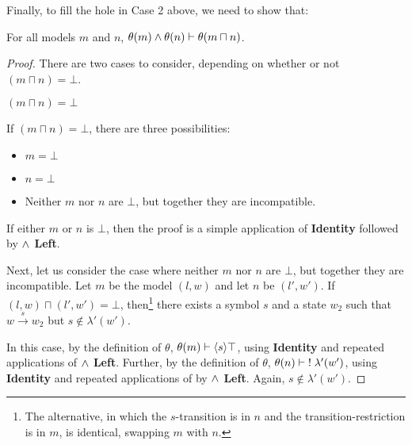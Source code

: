 Finally, to fill the hole in Case 2 above, we need to show that:
\begin{lemma}
For all models $m$ and $n$, $\theta(m) \land \theta(n) \vdash \theta (m \sqcap n)$.
\end{lemma}

\begin{proof}

There are two cases to consider, depending on whether or not $(m \sqcap n) = \bot$.

\setcounter{mycase}{0}

\begin{mycase}
$(m \sqcap n) = \bot$
\end{mycase}
If $(m \sqcap n) = \bot$, there are three possibilities:
\begin{itemize}
\item
$m = \bot$
\item
$n = \bot$
\item
Neither $m$ nor $n$ are $\bot$, but together they are incompatible. 
\end{itemize}
If either $m$ or $n$ is $\bot$, then the proof is a simple application of {\bf Identity} followed by {\bf $\land$ Left}.

Next, let us consider the case where neither $m$ nor $n$ are $\bot$, but together they are incompatible.
Let $m$ be the  model $(l, w)$ and let $n$ be $(l', w')$.
If $(l, w) \sqcap (l', w') = \bot$, then\footnote{The alternative, in which the $s$-transition is in $n$ and the transition-restriction is in $m$, is identical, swapping $m$ with $n$.} there exists a symbol $s$ and a state $w_2$ such that $w \xrightarrow{s} w_2$ but $s \notin \lambda'(w')$.

In this case, by the definition of $\theta$, $\theta(m) \vdash \langle s \rangle \top$, using  {\bf Identity} and repeated applications of {\bf $\land$ Left}.
Further, by the definition of $\theta$, $\theta(n) \vdash \; ! \; \lambda'(w')$, using  {\bf Identity} and repeated applications of by {\bf $\land$ Left}. Again, $s \notin  \lambda'(w')$.


\end{proof}
